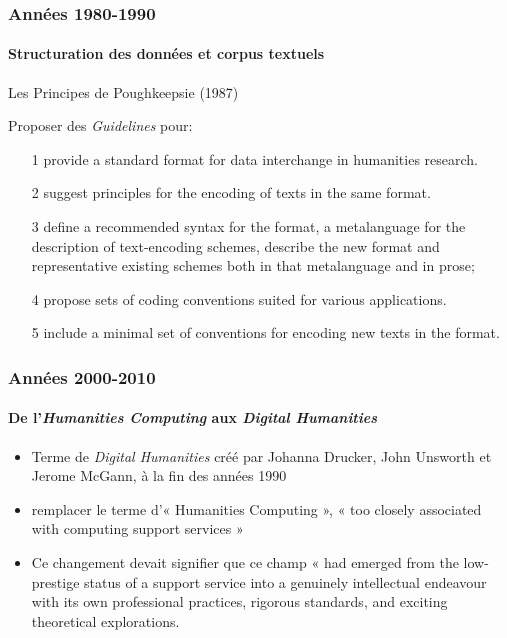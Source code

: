 \documentclass[ignorenonframetext]{beamer}
\begin{document}
\begin{frame}
\frametitle{Années 1980-1990}
\framesubtitle{Structuration des données et corpus textuels}


\begin{block}{Les Principes de Poughkeepsie (1987)}

Proposer des \textit{Guidelines} pour:

\begin{itemize}
	\item[1] provide a standard format for data interchange in humanities research.
	\item[2] suggest principles for the encoding of texts in the same format.
	\item[3] define a recommended syntax for the format, a metalanguage for the description of text-encoding schemes, describe the new format and representative existing schemes both in that metalanguage and in prose;
	\item[4] propose sets of coding conventions suited for various applications.
	\item[5] include a minimal set of conventions for encoding new texts in the format.
\end{itemize} 
\end{block}

\end{frame}

%
%		
%		
%

\begin{frame}
\frametitle{Années 2000-2010}
\framesubtitle{De l'\textit{Humanities Computing} aux \textit{Digital Humanities}}

\begin{itemize}
	\item Terme de \textit{Digital Humanities} créé par Johanna Drucker, John Unsworth et Jerome McGann, à la fin des années 1990
	\item remplacer le terme d’« Humanities Computing », « too closely associated with computing support services »
	\item Ce changement devait signifier que ce champ « had emerged from the low-
	prestige status of a support service into a genuinely intellectual endeavour with its own professional practices, rigorous standards, and exciting theoretical explorations.
\end{itemize}

\end{frame}
\end{document}
